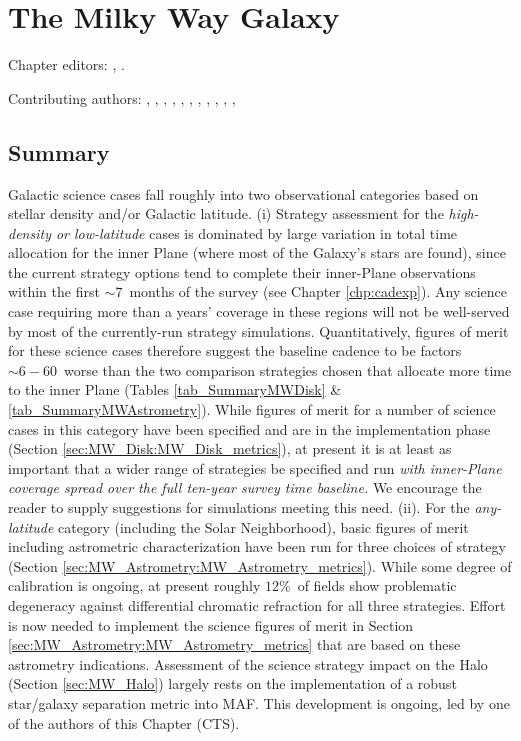 
\chapter[The Milky Way Galaxy]{The Milky Way Galaxy}
\def\chpname{galaxy}\label{chp:\chpname}

Chapter editors:
,
.

Contributing authors:
,
,
,
,
,
,
,
,
,
,
,

\section*{Summary}

Galactic science cases fall
roughly into two observational categories based on stellar density and/or Galactic
latitude. (i) Strategy assessment for the {\it high-density or low-latitude}
cases is dominated by large variation in total time allocation for the
inner Plane (where most of the Galaxy's stars are found), since the
current strategy options tend to complete their inner-Plane
observations within the first $\sim 7$~months of the survey (see
Chapter \ref{chp:cadexp}). Any science case requiring more than a
years' coverage in these regions will not be well-served by most of
the currently-run strategy simulations. Quantitatively, figures of merit for
these science cases therefore suggest the baseline cadence to be
factors $\sim 6-60$~worse than the two comparison strategies chosen
that allocate more time to the inner Plane (Tables
\ref{tab_SummaryMWDisk} \& \ref{tab_SummaryMWAstrometry}). While
figures of merit for a number of science cases in this category have
been specified and are in the implementation phase (Section
\ref{sec:MW_Disk:MW_Disk_metrics}), at present it is at least as
important that a wider range of strategies be specified and run {\it
  with inner-Plane coverage spread over the full ten-year survey time
  baseline.} We encourage the reader to supply suggestions for
simulations meeting this need. (ii). For the {\it any-latitude}
category (including the Solar Neighborhood), basic figures of merit
including astrometric characterization have been run for three choices
of strategy (Section
\ref{sec:MW_Astrometry:MW_Astrometry_metrics}). While some degree of
calibration is ongoing, at present roughly $12\%$~of fields show
problematic degeneracy against differential chromatic refraction for
all three strategies. Effort is now needed to implement the science
figures of merit in Section
\ref{sec:MW_Astrometry:MW_Astrometry_metrics} that are based on these
astrometry indications. Assessment of the science strategy impact on
the Halo (Section \ref{sec:MW_Halo}) largely rests on the
implementation of a robust star/galaxy separation metric into
MAF. This development is ongoing, led by one of the authors of this
Chapter (CTS).




